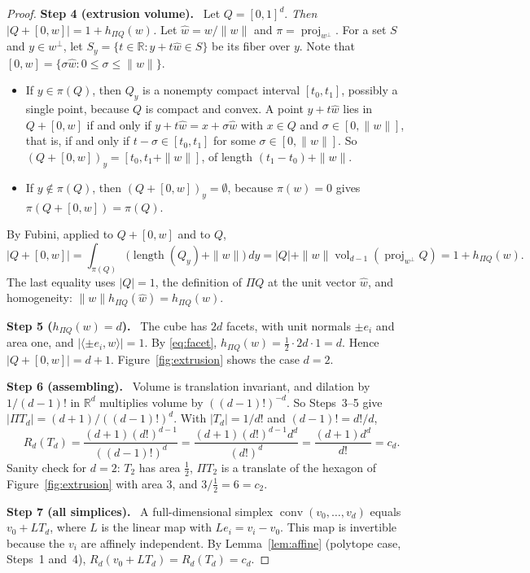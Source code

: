 \documentclass[11pt]{article}
\newcommand{\R}{\mathbb R}
\DeclareMathOperator{\conv}{conv}
\DeclareMathOperator{\vol}{vol}
\DeclareMathOperator{\proj}{proj}
\newcommand{\step}[1]{\par\smallskip\noindent\textbf{#1}\ }
\begin{document}
\begin{proof}
\step{Step 4 (extrusion volume).} Let \(Q=[0,1]^d\). \emph{Then
\(|Q+[0,w]|=1+h_{\Pi Q}(w)\).} Let \(\hat w=w/\|w\|\) and
\(\pi=\proj_{w^\perp}\). For a set \(S\) and \(y\in w^\perp\), let
\(S_y=\{t\in\R:y+t\hat w\in S\}\) be its fiber over \(y\). Note that
\([0,w]=\{\sigma\hat w:0\le\sigma\le\|w\|\}\).
\begin{itemize}[leftmargin=2em,itemsep=2pt]
\item If \(y\in\pi(Q)\), then \(Q_y\) is a nonempty compact interval
 \([t_0,t_1]\), possibly a single point, because \(Q\) is compact and
 convex. A point \(y+t\hat w\) lies in \(Q+[0,w]\) if and only if
 \(y+t\hat w=x+\sigma\hat w\) with \(x\in Q\) and
 \(\sigma\in[0,\|w\|]\), that is, if and only if
 \(t-\sigma\in[t_0,t_1]\) for some \(\sigma\in[0,\|w\|]\). So
 \((Q+[0,w])_y=[t_0,t_1+\|w\|]\), of length \((t_1-t_0)+\|w\|\).
\item If \(y\notin\pi(Q)\), then \((Q+[0,w])_y=\emptyset\), because
 \(\pi(w)=0\) gives \(\pi(Q+[0,w])=\pi(Q)\).
\end{itemize}
By Fubini, applied to \(Q+[0,w]\) and to \(Q\),
\[
 |Q+[0,w]|
 =\int_{\pi(Q)}\bigl(\operatorname{length}(Q_y)+\|w\|\bigr)\,dy
 =|Q|+\|w\|\vol_{d-1}(\proj_{w^\perp}Q)
 =1+h_{\Pi Q}(w).
\]
The last equality uses \(|Q|=1\), the definition of \(\Pi Q\) at the unit
vector \(\hat w\), and homogeneity: \(\|w\|h_{\Pi Q}(\hat w)=h_{\Pi Q}(w)\).

\step{Step 5 (\(h_{\Pi Q}(w)=d\)).} The cube has \(2d\) facets, with unit
normals \(\pm e_i\) and area one, and \(|\langle\pm e_i,w\rangle|=1\). By
\eqref{eq:facet}, \(h_{\Pi Q}(w)=\tfrac12\cdot2d\cdot1=d\). Hence
\(|Q+[0,w]|=d+1\). Figure~\ref{fig:extrusion} shows the case \(d=2\).

\step{Step 6 (assembling).} Volume is translation invariant, and dilation
by \(1/(d-1)!\) in \(\R^d\) multiplies volume by \(((d-1)!)^{-d}\). So
Steps~3--5 give \(|\Pi T_d|=(d+1)/((d-1)!)^d\). With \(|T_d|=1/d!\) and
\((d-1)!=d!/d\),
\[
 R_d(T_d)=\frac{(d+1)(d!)^{d-1}}{((d-1)!)^d}
 =\frac{(d+1)(d!)^{d-1}d^d}{(d!)^d}
 =\frac{(d+1)d^d}{d!}=c_d.
\]
Sanity check for \(d=2\): \(T_2\) has area \(\tfrac12\), \(\Pi T_2\) is a
translate of the hexagon of Figure~\ref{fig:extrusion} with area \(3\), and
\(3/\tfrac12=6=c_2\).

\step{Step 7 (all simplices).} A full-dimensional simplex
\(\conv(v_0,\dots,v_d)\) equals \(v_0+LT_d\), where \(L\) is the linear map
with \(Le_i=v_i-v_0\). This map is invertible because the \(v_i\) are
affinely independent. By Lemma~\ref{lem:affine} (polytope case, Steps~1
and~4), \(R_d(v_0+LT_d)=R_d(T_d)=c_d\).
\end{proof}
\end{document}
